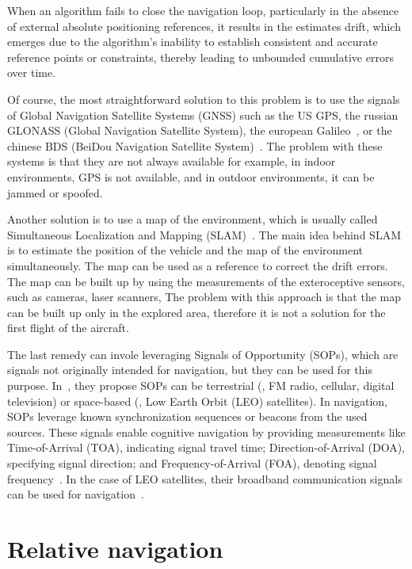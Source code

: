 When an algorithm fails to close the navigation loop, particularly in the absence of external absolute positioning references, it results in the estimates drift, which emerges due to the algorithm's inability to establish consistent and accurate reference points or constraints, thereby leading to unbounded cumulative errors over time.

Of course, the most straightforward solution to this problem is to use the signals of Global Navigation Satellite Systems (GNSS) such as the US GPS, the russian GLONASS (Global Navigation Satellite System), the european Galileo~\cite{GNSS}, or the chinese BDS (BeiDou Navigation Satellite System)~\cite{BeiDou}. The problem with these systems is that they are not always available for example, in indoor environments, GPS is not available, and in outdoor environments, it can be jammed or spoofed. 

Another solution is to use a map of the environment, which is usually called Simultaneous Localization and Mapping (SLAM)~\cite{SLAM}. The main idea behind SLAM is to estimate the position of the vehicle and the map of the environment simultaneously. The map can be used as a reference to correct the drift errors. The map can be built up by using the measurements of the exteroceptive sensors, such as cameras, laser scanners, \etc{} The problem with this approach is that the map can be built up only in the explored area, therefore it is not a solution for the first flight of the aircraft. 

The last remedy can invole leveraging Signals of Opportunity (SOPs), which are signals not originally intended for navigation, but they can be used for this purpose. In~\cite{SOP}, they propose SOPs can be terrestrial (\eg{}, FM radio, cellular, digital television) or space-based (\eg{}, Low Earth Orbit (LEO) satellites). In navigation, SOPs leverage known synchronization sequences or beacons from the used sources. These signals enable cognitive navigation by providing measurements like Time-of-Arrival (TOA), indicating signal travel time; Direction-of-Arrival (DOA), specifying signal direction; and Frequency-of-Arrival (FOA), denoting signal frequency~\cite{SOP-terrestrial}. In the case of LEO satellites, their broadband communication signals can be used for navigation~\cite{SOP-LEO}. 

\section{Relative navigation}

